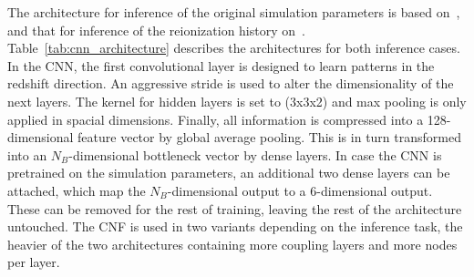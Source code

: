 The architecture for inference of the original simulation parameters is based on~\cite{Schosser_2026}, and that for inference of the reionization history on~\cite{Pietschke_2025}. Table~\ref{tab:cnn_architecture} describes the architectures for both inference cases. In the CNN, the first convolutional layer is designed to learn patterns in the redshift direction. An aggressive stride is used to alter the dimensionality of the next layers. The kernel for hidden layers is set to (3x3x2) and max pooling is only applied in spacial dimensions. Finally, all information is compressed into a 128-dimensional feature vector by global average pooling. This is in turn transformed into an $N_B$-dimensional bottleneck vector by dense layers. In case the CNN is pretrained on the simulation parameters, an additional two dense layers can be attached, which map the $N_B$-dimensional output to a $6$-dimensional output. These can be removed for the rest of training, leaving the rest of the architecture untouched. The CNF is used in two variants depending on the inference task, the heavier of the two architectures containing more coupling layers and more nodes per layer. 
